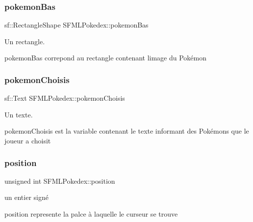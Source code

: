 \subsubsection{\texorpdfstring{pokemon\+Bas}{pokemonBas}}
{\footnotesize\ttfamily sf\+::\+Rectangle\+Shape S\+F\+M\+L\+Pokedex\+::pokemon\+Bas\hspace{0.3cm}{\ttfamily [private]}}



Un rectangle. 

pokemon\+Bas correpond au rectangle contenant l\textquotesingle{}image du Pokémon \mbox{\label{class_s_f_m_l_pokedex_a8a50323dc304817b241e621de75c98da}} 
\subsubsection{\texorpdfstring{pokemon\+Choisis}{pokemonChoisis}}
{\footnotesize\ttfamily sf\+::\+Text S\+F\+M\+L\+Pokedex\+::pokemon\+Choisis\hspace{0.3cm}{\ttfamily [private]}}



Un texte. 

pokemon\+Choisis est la variable contenant le texte informant des Pokémons que le joueur a choisit \mbox{\label{class_s_f_m_l_pokedex_a933421afd4da00a1a3e1f5cf812d72af}} 
\subsubsection{\texorpdfstring{position}{position}}
{\footnotesize\ttfamily unsigned int S\+F\+M\+L\+Pokedex\+::position\hspace{0.3cm}{\ttfamily [private]}}



un entier signé 

position represente la palce à laquelle le curseur se trouve \mbox{\label{class_s_f_m_l_pokedex_a1ab75884d1bfab5c12a6392c5a432804}} 
